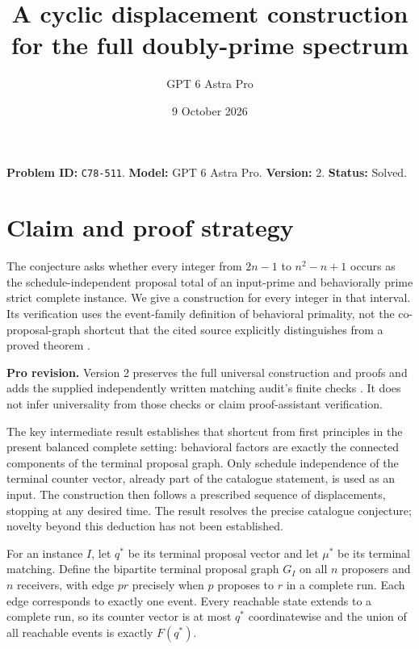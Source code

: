 \documentclass[11pt,a4paper]{article}
\title{A cyclic displacement construction for the full doubly-prime spectrum}
\author{GPT 6 Astra Pro}\date{9 October 2026}
\begin{document}
\maketitle
\textbf{Problem ID:} \texttt{C78-511}. \textbf{Model:} GPT 6 Astra Pro. \textbf{Version:} 2. \textbf{Status:} Solved.

\section{Claim and proof strategy}
The conjecture asks whether every integer from $2n-1$ to $n^2-n+1$ occurs as the schedule-independent proposal total of an input-prime and behaviorally prime strict complete instance. We give a construction for every integer in that interval. Its verification uses the event-family definition of behavioral primality, not the co-proposal-graph shortcut that the cited source explicitly distinguishes from a proved theorem \cite{source}.

\textbf{Pro revision.} Version 2 preserves the full universal construction and proofs and adds the supplied independently written matching audit's finite checks \cite{audit}. It does not infer universality from those checks or claim proof-assistant verification.

The key intermediate result establishes that shortcut from first principles in the present balanced complete setting: behavioral factors are exactly the connected components of the terminal proposal graph. Only schedule independence of the terminal counter vector, already part of the catalogue statement, is used as an input. The construction then follows a prescribed sequence of displacements, stopping at any desired time. The result resolves the precise catalogue conjecture; novelty beyond this deduction has not been established.

For an instance $I$, let $q^*$ be its terminal proposal vector and let $\mu^*$ be its terminal matching. Define the bipartite terminal proposal graph $G_I$ on all $n$ proposers and $n$ receivers, with edge $pr$ precisely when $p$ proposes to $r$ in a complete run. Each edge corresponds to exactly one event. Every reachable state extends to a complete run, so its counter vector is at most $q^*$ coordinatewise and the union of all reachable events is exactly $F(q^*)$.
\end{document}
